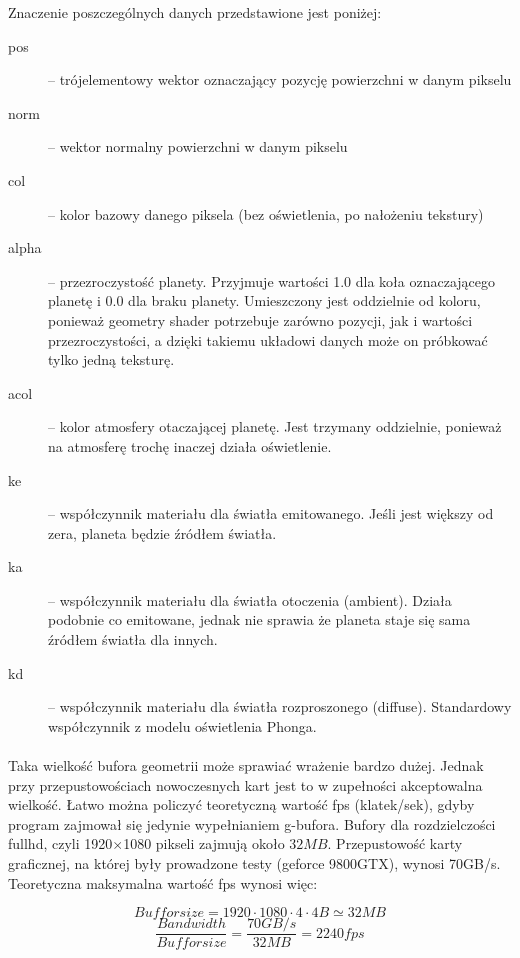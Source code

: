 Znaczenie poszczególnych danych przedstawione jest poniżej:

\begin{description}
\item[pos] -- trójelementowy wektor oznaczający pozycję powierzchni w danym pikselu
\item[norm] -- wektor normalny powierzchni w danym pikselu
\item[col] -- kolor bazowy danego piksela (bez oświetlenia, po nałożeniu tekstury)
\item[alpha] -- przezroczystość planety. Przyjmuje wartości 1.0 dla koła oznaczającego planetę i 0.0 dla braku planety. Umieszczony jest oddzielnie od koloru, ponieważ geometry shader potrzebuje zarówno pozycji, jak i wartości przezroczystości, a dzięki takiemu układowi danych może on próbkować tylko jedną teksturę.
\item[acol] -- kolor atmosfery otaczającej planetę. Jest trzymany oddzielnie, ponieważ na atmosferę trochę inaczej działa oświetlenie.
\item[ke] -- współczynnik materiału dla światła emitowanego. Jeśli jest większy od zera, planeta będzie źródłem światła.
\item[ka] -- współczynnik materiału dla światła otoczenia (ambient). Działa podobnie co emitowane, jednak nie sprawia że planeta staje się sama źródłem światła dla innych.
\item[kd] -- współczynnik materiału dla światła rozproszonego (diffuse). Standardowy współczynnik z modelu oświetlenia Phonga.
\end{description}

\paragraph{}

Taka wielkość bufora geometrii może sprawiać wrażenie bardzo dużej. Jednak przy przepustowościach nowoczesnych kart jest to w zupełności akceptowalna wielkość. Łatwo można policzyć teoretyczną wartość fps (klatek/sek), gdyby program zajmował się jedynie wypełnianiem g-bufora. Bufory dla rozdzielczości fullhd, czyli 1920$\times$1080 pikseli zajmują około $32MB$. Przepustowość karty graficznej, na której były prowadzone testy (geforce 9800GTX), wynosi 70GB/s. Teoretyczna maksymalna wartość fps wynosi więc:

$$ Buffor size = 1920 \cdot 1080 \cdot 4 \cdot 4B \simeq 32MB $$
$$ \frac{Bandwidth}{Buffor size} = \frac{70GB/s}{32MB} = 2240 fps $$

